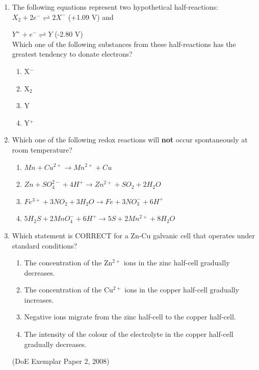 \begin{eocexercises}{}
\begin{enumerate}
\begin{enumerate}
(IEB Paper 2, 2002)

	\item{The following equations represent two hypothetical half-reactions:\\

\rm${X_{2} + 2e^{-} \rightleftharpoons 2X^{-}}$ (+1.09 V) and

\rm${Y^{+} + e^{-} \rightleftharpoons Y}$ (-2.80 V)\\

Which one of the following substances from these half-reactions has the greatest tendency to donate electrons?}

		\begin{enumerate}
		\item{X$^{-}$}
		\item{X$_{2}$}
		\item{Y}
		\item{Y$^{+}$}
		\end{enumerate}


	\item{Which one of the following redox reactions will \textbf{not} occur spontaneously at room temperature?}

		\begin{enumerate}
		\item{\rm${Mn + Cu^{2+} \rightarrow Mn^{2+} + Cu}$}
		\item{\rm${Zn + SO_{4}^{2-} + 4H^{+} \rightarrow Zn^{2+} + SO_{2} + 2H_{2}O}$}
		\item{\rm${Fe^{3+} + 3NO_{2} + 3H_{2}O \rightarrow Fe + 3NO_{3}^{-} + 6H^{+}}$}
		\item{\rm${5H_{2}S + 2MnO_{4}^{-} + 6H^{+}\rightarrow 5S + 2Mn^{2+} + 8H_{2}O}$}
		\end{enumerate}

	\item{Which statement is CORRECT for a Zn-Cu galvanic cell that operates under standard conditions?}
		\begin{enumerate}
		\item{The concentration of the Zn$^{2+}$ ions in the zinc half-cell gradually decreases.}
		\item{The concentration of the Cu$^{2+}$ ions in the copper half-cell gradually increases.}
		\item{Negative ions migrate from the zinc half-cell to the copper half-cell.}
		\item{The intensity of the colour of the electrolyte in the copper half-cell gradually decreases.}
		\end{enumerate}
(DoE Exemplar Paper 2, 2008)


\end{enumerate}
\end{enumerate}
\end{eocexercises}
